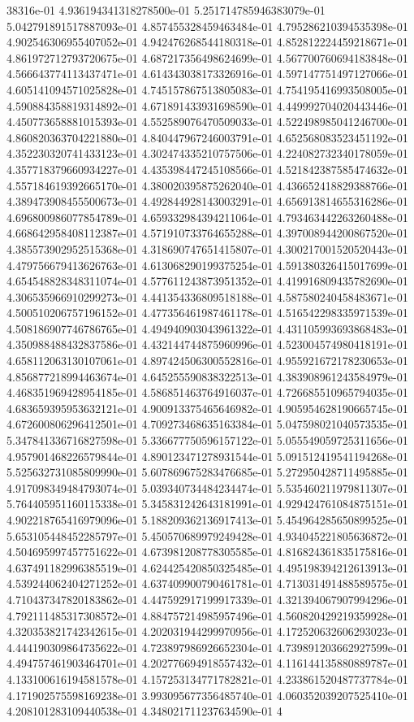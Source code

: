 38316e-01	4.936194341318278500e-01	5.251714785946383079e-01	5.042791891517887093e-01	4.857455328459463484e-01	4.795286210394535398e-01	4.902546306955407052e-01	4.942476268544180318e-01	4.852812224459218671e-01	4.861972712793720675e-01	4.687217356498624699e-01	4.567700760694183848e-01	4.566643774113437471e-01	4.614343038173326916e-01	4.597147751497127066e-01	4.605141094571025828e-01	4.745157867513805083e-01	4.754195416993508005e-01	4.590884358819314892e-01	4.671891433931698590e-01	4.449992704020443446e-01	4.450773658881015393e-01	4.552589076470509033e-01	4.522498985041246700e-01	4.860820363704221880e-01	4.840447967246003791e-01	4.652568083523451192e-01	4.352230320741433123e-01	4.302474335210757506e-01	4.224082732340178059e-01	4.357718379660934227e-01	4.435398447245108566e-01	4.521842387585474632e-01	4.557184619392665170e-01	4.380020395875262040e-01	4.436652418829388766e-01	4.389473908455500673e-01	4.492844928143003291e-01	4.656913814655316286e-01	4.696800986077854789e-01	4.659332984394211064e-01	4.793463442263260488e-01	4.668642958408112387e-01	4.571910733764655288e-01	4.397008944200867520e-01	4.385573902952515368e-01	4.318690747651415807e-01	4.300217001520520443e-01	4.479756679413626763e-01	4.613068290199375254e-01	4.591380326415017699e-01	4.654548828348311074e-01	4.577611243873951352e-01	4.419916809435782690e-01	4.306535966910299273e-01	4.441354336809518188e-01	4.587580240458483671e-01	4.500510206757196152e-01	4.477356461987461178e-01	4.516542298335971539e-01	4.508186907746786765e-01	4.494940903043961322e-01	4.431105993693868483e-01	4.350988488432837586e-01	4.432144744875960996e-01	4.523004574980418191e-01	4.658112063130107061e-01	4.897424506300552816e-01	4.955921672178230653e-01	4.856877218994463674e-01	4.645255590838322513e-01	4.383908961243584979e-01	4.468351969428954185e-01	4.586851463764916037e-01	4.726685510965794035e-01	4.683659395953632121e-01	4.900913375465646982e-01	4.905954628190665745e-01	4.672600806296412501e-01	4.709273468635163384e-01	5.047598021040573535e-01	5.347841336716827598e-01	5.336677750596157122e-01	5.055549059725311656e-01	4.957901468226579844e-01	4.890123471278931544e-01	5.091512419541194268e-01	5.525632731085809990e-01	5.607869675283476685e-01	5.272950428711495885e-01	4.917098349484793074e-01	5.039340734484234474e-01	5.535460211979811307e-01	5.764405951160115338e-01	5.345831242643181991e-01	4.929424761084875151e-01	4.902218765416979096e-01	5.188209362136917413e-01	5.454964285650899525e-01	5.653105448452285797e-01	5.450570689979249428e-01	4.934045221805636872e-01	4.504695997457751622e-01	4.673981208778305585e-01	4.816824361835175816e-01	4.637491182996385519e-01	4.624425420850325485e-01	4.495198394212613913e-01	4.539244062404271252e-01	4.637409900790461781e-01	4.713031491488589575e-01	4.710437347820183862e-01	4.447592917199917339e-01	4.321394067907994296e-01	4.792111485317308572e-01	4.884757214985957496e-01	4.560820429219359928e-01	4.320353821742342615e-01	4.202031944299970956e-01	4.172520632606293023e-01	4.444190309864735622e-01	4.723897986926652304e-01	4.739891203662927599e-01	4.494757461903464701e-01	4.202776694918557432e-01	4.116144135880889787e-01	4.133100616194581578e-01	4.157253134771782821e-01	4.233861520487737784e-01	4.171902575598169238e-01	3.993095677356485740e-01	4.060352039207525410e-01	4.208101283109440538e-01	4.348021711237634590e-01	4